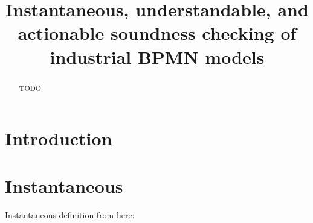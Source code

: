 \documentclass[runningheads]{llncs}
\begin{document}
%
\title{Instantaneous, understandable, and actionable soundness checking of industrial BPMN models}
%
%
%
\maketitle              %
%
\begin{abstract}
TODO
\end{abstract}


\section{Introduction}
\cite{fahlandAnalysisDemandInstantaneous2011}

\cite{corradiniClassificationBPMNCollaborations2018}


\section{Instantaneous}
Instantaneous definition from here: \cite{fahlandAnalysisDemandInstantaneous2011}
\end{document}
